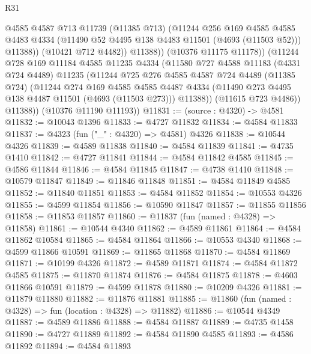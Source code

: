 \begin{lexlean}{R31}
\begin{coremodule}
                  @4585
                  @4587
                  @713
                  @11739
                  (@11385 @713)
                  (@11244
                    @256
                    @169
                    @4585
                    @4585
                    @4483
                    @4334
                    (@11490 @52 @4495 @138 @4483 @11501 (@4693 (@11503 @52)))
                    @11388))
                (@10421 @712 @4482))
              @11388))
          (@10376 @11175 @11178))
        (@11244
          @728
          @169
          @11184
          @4585
          @11235
          @4334
          (@11580
            @727
            @4588
            @11183
            (@4331 @724 @4489)
            @11235
            (@11244
              @725
              @276
              @4585
              @4587
              @724
              @4489
              (@11385 @724)
              (@11244
                @274
                @169
                @4585
                @4585
                @4487
                @4334
                (@11490 @273 @4495 @138 @4487 @11501 (@4693 (@11503 @273)))
                @11388))
            (@11615 @723 @4486))
          @11388))
      (@10376 @11190 @11193))
@11831 := (source : @4320) -> @4581
@11832 := @10043 @1396
@11833 := @4727 @11832
@11834 := @4584 @11833
@11837 := @4323 (fun ("_" : @4320) => @4581) @4326
@11838 := @10544 @4326
@11839 := @4589 @11838
@11840 := @4584 @11839
@11841 := @4735 @1410
@11842 := @4727 @11841
@11844 := @4584 @11842 @4585
@11845 := @4586 @11844
@11846 := @4584 @11845
@11847 := @4738 @1410
@11848 := @10579 @11847
@11849 := @11846 @11848
@11851 := @4584 @11849 @4585
@11852 := @11840 @11851
@11853 := @4584 @11852
@11854 := @10553 @4326
@11855 := @4599 @11854
@11856 := @10590 @11847
@11857 := @11855 @11856
@11858 := @11853 @11857
@11860 := @11837 (fun (named : @4328) => @11858)
@11861 := @10544 @4340
@11862 := @4589 @11861
@11864 := @4584 @11862 @10584
@11865 := @4584 @11864
@11866 := @10553 @4340
@11868 := @4599 @11866 @10591
@11869 := @11865 @11868
@11870 := @4584 @11869
@11871 := @10199 @4326
@11872 := @4589 @11871
@11874 := @4584 @11872 @4585
@11875 := @11870 @11874
@11876 := @4584 @11875
@11878 := @4603 @11866 @10591
@11879 := @4599 @11878
@11880 := @10209 @4326
@11881 := @11879 @11880
@11882 := @11876 @11881
@11885 := @11860 (fun (named : @4328) => fun (location : @4328) => @11882)
@11886 := @10544 @4349
@11887 := @4589 @11886
@11888 := @4584 @11887
@11889 := @4735 @1458
@11890 := @4727 @11889
@11892 := @4584 @11890 @4585
@11893 := @4586 @11892
@11894 := @4584 @11893

\end{coremodule}
\end{lexlean}
